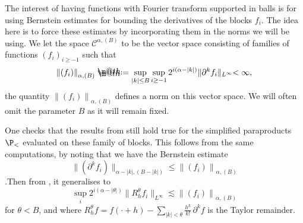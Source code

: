 \documentclass[11pt]{preprint}
\makeatletter
\newcommand{\mcC}{\mathcal{C}}
\newcommand*{\defeq}{\mathrel{\rlap{%
			\raisebox{0.3ex}{$\m@th\cdot$}}%
		\raisebox{-0.3ex}{$\m@th\cdot$}}%
	=}
\newcommand{\norme}[1]{\left\lVert #1 \right\lVert}
\makeatother
\begin{document}
\begin{appendix}
	The  interest of having functions with Fourier transform supported in balls is for using Bernstein estimates for bounding the derivatives of the blocks $f_i$. The idea here is to force these estimates by incorporating them in the norms we will be using. We let the space $\mcC^{\alpha , (B)}$ to be the vector space consisting of families of functions $(f_i)_{i\geq -1}$ such that
	$$
	\norme{(f_i)}_{\alpha,(B)} \defeq \sup_{|k| \leq B} \sup_{i\geq -1} 2^{i(\alpha-|k|)}\lVert \partial^k f_i \lVert_{L^\infty} < \infty, 
	$$ 
	the quantity $\norme{(f_i)}_{\alpha,(B)}$ defines a norm on this vector space. We will often omit the parameter $B$ as it will remain fixed. 
	
	
	One checks that the results from \cite[Section 2]{LocalExpansionsParacSystems} still hold true for the simplified paraproducts $\P_<$ evaluated on these family of blocks. This follows from the same computations, by noting that we have the Bernstein estimate $$	\big\lVert{(\partial^kf_i)}\big\lVert_{\alpha-|k|,(B-|k|)}\leq 	\norme{(f_i)}_{\alpha,(B)}$$.Then from \cite[Lemma 3]{LocalExpansionsParacSystems}, it generalises to $$\sup_i 2^{i(\alpha-|\theta|)} \big\lVert{R_h^\theta f_i}\big\lVert_{L^\infty} \lesssim 	\norme{(f_i)}_{\alpha,(B)}$$ for $\theta<B$, and where $R_h^\theta f=f(\cdot+h) - \sum_{|k|<\theta} \frac{h^k}{k!} \, \partial^kf $ is the Taylor remainder.  
	

\end{appendix}
\end{document}
